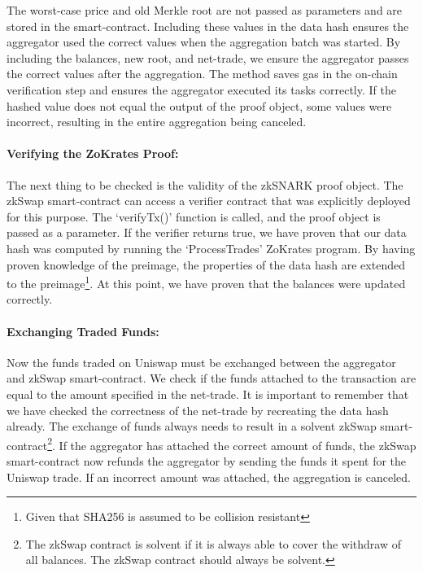 \documentclass[../../thesis.tex]{subfiles}
\begin{document}
The worst-case price and old Merkle root are not passed as parameters and are stored in the smart-contract. Including these values in the data hash ensures the aggregator used the correct values when the aggregation batch was started. By including the balances, new root, and net-trade, we ensure the aggregator passes the correct values after the aggregation. The method saves gas in the on-chain verification step and ensures the aggregator executed its tasks correctly. If the hashed value does not equal the output of the proof object, some values were incorrect, resulting in the entire aggregation being canceled. 

\paragraph{Verifying the ZoKrates Proof:}
The next thing to be checked is the validity of the zkSNARK proof object. The zkSwap smart-contract can access a verifier contract that was explicitly deployed for this purpose. The `verifyTx()' function is called, and the proof object is passed as a parameter. If the verifier returns true, we have proven that our data hash was computed by running the `ProcessTrades' ZoKrates program. By having proven knowledge of the preimage, the properties of the data hash are extended to the preimage\footnote{Given that SHA256 is assumed to be collision resistant}. At this point, we have proven that the balances were updated correctly.

\paragraph{Exchanging Traded Funds:}
Now the funds traded on Uniswap must be exchanged between the aggregator and zkSwap smart-contract. We check if the funds attached to the transaction are equal to the amount specified in the net-trade. It is important to remember that we have checked the correctness of the net-trade by recreating the data hash already. The exchange of funds always needs to result in a solvent zkSwap smart-contract\footnote{The zkSwap contract is solvent if it is always able to cover the withdraw of all balances. The zkSwap contract should always be solvent.}. If the aggregator has attached the correct amount of funds, the zkSwap smart-contract now refunds the aggregator by sending the funds it spent for the Uniswap trade. If an incorrect amount was attached, the aggregation is canceled.
\end{document}
